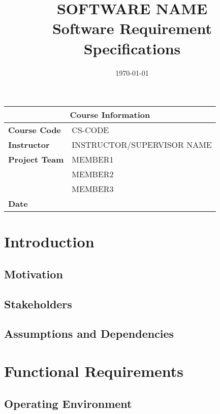 \documentclass{article}
\title{SOFTWARE NAME \\ Software Requirement Specifications}
\author{}
\date{\vspace{-5ex}}
\begin{document}
\maketitle

\begin{center}
    \begin{tabular}{|l|l|}
        \hline
        \multicolumn{2}{|c|}{\textbf{Course Information}} \\
        \hline
        \textbf{Course Code} & CS-CODE \\
        \hline
        \textbf{Instructor} & INSTRUCTOR/SUPERVISOR NAME \\
        \hline
        \textbf{Project Team} & MEMBER1   \\
                             & MEMBER2 \\
                             & MEMBER3 \\
        \hline
        \textbf{Date} & \date{\today} \\
        \hline
    \end{tabular}
\end{center}

\tableofcontents

\newpage

\section{Introduction}

\subsection{Motivation}

\subsection{Stakeholders}

\subsection{Assumptions and Dependencies}


\section{Functional Requirements}


\subsection{Operating Environment}
\end{document}
